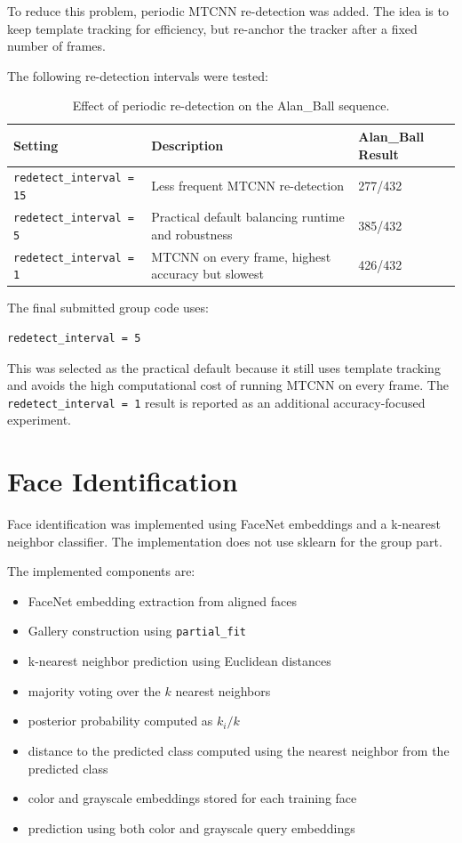 \documentclass[11pt,a4paper]{article}
\begin{document}
To reduce this problem, periodic MTCNN re-detection was added. The idea is to keep template tracking for efficiency, but re-anchor the tracker after a fixed number of frames.

The following re-detection intervals were tested:

\begin{table}[h]
\centering
\begin{tabular}{p{4cm}p{6cm}p{4cm}}
\toprule
\textbf{Setting} & \textbf{Description} & \textbf{Alan\_Ball Result} \\
\midrule
\texttt{redetect\_interval = 15} & Less frequent MTCNN re-detection & 277/432 \\
\texttt{redetect\_interval = 5} & Practical default balancing runtime and robustness & 385/432 \\
\texttt{redetect\_interval = 1} & MTCNN on every frame, highest accuracy but slowest & 426/432 \\
\bottomrule
\end{tabular}
\caption{Effect of periodic re-detection on the Alan\_Ball sequence.}
\end{table}

The final submitted group code uses:

\begin{lstlisting}
redetect_interval = 5
\end{lstlisting}

This was selected as the practical default because it still uses template tracking and avoids the high computational cost of running MTCNN on every frame. The \texttt{redetect\_interval = 1} result is reported as an additional accuracy-focused experiment.

\section{Face Identification}

Face identification was implemented using FaceNet embeddings and a k-nearest neighbor classifier. The implementation does not use sklearn for the group part.

The implemented components are:

\begin{itemize}[noitemsep]
    \item FaceNet embedding extraction from aligned faces
    \item Gallery construction using \texttt{partial\_fit}
    \item k-nearest neighbor prediction using Euclidean distances
    \item majority voting over the $k$ nearest neighbors
    \item posterior probability computed as $k_i/k$
    \item distance to the predicted class computed using the nearest neighbor from the predicted class
    \item color and grayscale embeddings stored for each training face
    \item prediction using both color and grayscale query embeddings
\end{itemize}
\end{document}

